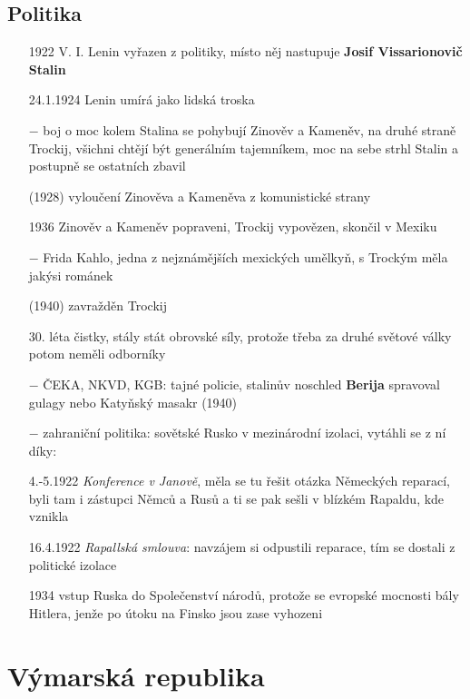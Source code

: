 \documentclass{article}
\begin{document}
\subsection*{Politika}
\begin{itemize}
    \vspace{-0.5em}
    \setlength\itemsep{0.15em}
    \item[1922] V. I. Lenin vyřazen z politiky, místo něj nastupuje \textbf{Josif Vissarionovič Stalin}
    \item[24.1.1924] Lenin umírá jako lidská troska
    \item[$-$] boj o moc kolem Stalina se pohybují Zinověv a Kameněv, na druhé straně Trockij, všichni chtějí být generálním tajemníkem, moc na sebe strhl Stalin a postupně se ostatních zbavil
    \item[(1928)] vyloučení Zinověva a Kameněva z komunistické strany
    \item[1936] Zinověv a Kameněv popraveni, Trockij vypovězen, skončil v Mexiku
    \item[$-$] Frida Kahlo, jedna z nejznámějších mexických umělkyň, s Trockým měla jakýsi románek
    \item[(1940)] zavražděn Trockij
    \item[30. léta] čistky, stály stát obrovské síly, protože třeba za druhé světové války potom neměli odborníky
    \item[$-$] ČEKA, NKVD, KGB: tajné policie, stalinův noschled \textbf{Berija} spravoval gulagy nebo Katyňský masakr (1940)
    \item[$-$] zahraniční politika: sovětské Rusko v mezinárodní izolaci, vytáhli se z ní díky:
    \item[4.-5.1922] \textit{Konference v Janově}, měla se tu řešit otázka Německých reparací, byli tam i zástupci Němců a Rusů a ti se pak sešli v blízkém Rapaldu, kde vznikla
    \item[16.4.1922] \textit{Rapallská smlouva}: navzájem si odpustili reparace, tím se dostali z politické izolace
    \item[1934] vstup Ruska do Společenství národů, protože se evropské mocnosti bály Hitlera, jenže po útoku na Finsko jsou zase vyhozeni
\end{itemize}


\section*{Výmarská republika}
\end{document}
